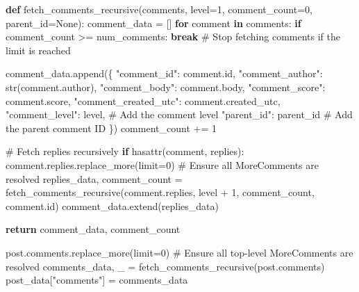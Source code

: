\documentclass[
  12pt,
  letterpaper,
  DIV=11,
  numbers=noendperiod]{scrartcl}
\newenvironment{Shaded}{\begin{snugshade}}{\end{snugshade}}
\newcommand{\BuiltInTok}[1]{\textcolor[rgb]{0.00,0.23,0.31}{#1}}
\newcommand{\CommentTok}[1]{\textcolor[rgb]{0.37,0.37,0.37}{#1}}
\newcommand{\ControlFlowTok}[1]{\textcolor[rgb]{0.00,0.23,0.31}{\textbf{#1}}}
\newcommand{\DecValTok}[1]{\textcolor[rgb]{0.68,0.00,0.00}{#1}}
\newcommand{\KeywordTok}[1]{\textcolor[rgb]{0.00,0.23,0.31}{\textbf{#1}}}
\newcommand{\NormalTok}[1]{\textcolor[rgb]{0.00,0.23,0.31}{#1}}
\newcommand{\OperatorTok}[1]{\textcolor[rgb]{0.37,0.37,0.37}{#1}}
\newcommand{\StringTok}[1]{\textcolor[rgb]{0.13,0.47,0.30}{#1}}
\newcommand{\VariableTok}[1]{\textcolor[rgb]{0.07,0.07,0.07}{#1}}
\begin{document}
\begin{Shaded}
\begin{Highlighting}[]
            \KeywordTok{def}\NormalTok{ fetch\_comments\_recursive(comments, level}\OperatorTok{=}\DecValTok{1}\NormalTok{, comment\_count}\OperatorTok{=}\DecValTok{0}\NormalTok{, parent\_id}\OperatorTok{=}\VariableTok{None}\NormalTok{):}
\NormalTok{                comment\_data }\OperatorTok{=}\NormalTok{ []}
                \ControlFlowTok{for}\NormalTok{ comment }\KeywordTok{in}\NormalTok{ comments:}
                    \ControlFlowTok{if}\NormalTok{ comment\_count }\OperatorTok{\textgreater{}=}\NormalTok{ num\_comments:}
                        \ControlFlowTok{break}  \CommentTok{\# Stop fetching comments if the limit is reached}

\NormalTok{                    comment\_data.append(\{}
                        \StringTok{"comment\_id"}\NormalTok{: comment.}\BuiltInTok{id}\NormalTok{,}
                        \StringTok{"comment\_author"}\NormalTok{: }\BuiltInTok{str}\NormalTok{(comment.author),}
                        \StringTok{"comment\_body"}\NormalTok{: comment.body,}
                        \StringTok{"comment\_score"}\NormalTok{: comment.score,}
                        \StringTok{"comment\_created\_utc"}\NormalTok{: comment.created\_utc,}
                        \StringTok{"comment\_level"}\NormalTok{: level,  }\CommentTok{\# Add the comment level}
                        \StringTok{"parent\_id"}\NormalTok{: parent\_id  }\CommentTok{\# Add the parent comment ID}
\NormalTok{                    \})}
\NormalTok{                    comment\_count }\OperatorTok{+=} \DecValTok{1}

                    \CommentTok{\# Fetch replies recursively}
                    \ControlFlowTok{if} \BuiltInTok{hasattr}\NormalTok{(comment, }\StringTok{\textquotesingle{}replies\textquotesingle{}}\NormalTok{):}
\NormalTok{                        comment.replies.replace\_more(limit}\OperatorTok{=}\DecValTok{0}\NormalTok{)  }\CommentTok{\# Ensure all \textquotesingle{}MoreComments\textquotesingle{} are resolved}
\NormalTok{                        replies\_data, comment\_count }\OperatorTok{=}\NormalTok{ fetch\_comments\_recursive(comment.replies, level }\OperatorTok{+} \DecValTok{1}\NormalTok{, comment\_count, comment.}\BuiltInTok{id}\NormalTok{)}
\NormalTok{                        comment\_data.extend(replies\_data)}

                \ControlFlowTok{return}\NormalTok{ comment\_data, comment\_count}

\NormalTok{            post.comments.replace\_more(limit}\OperatorTok{=}\DecValTok{0}\NormalTok{)  }\CommentTok{\# Ensure all top{-}level \textquotesingle{}MoreComments\textquotesingle{} are resolved}
\NormalTok{            comments\_data, \_ }\OperatorTok{=}\NormalTok{ fetch\_comments\_recursive(post.comments)}
\NormalTok{            post\_data[}\StringTok{"comments"}\NormalTok{] }\OperatorTok{=}\NormalTok{ comments\_data}


\end{Highlighting}
\end{Shaded}
\end{document}
